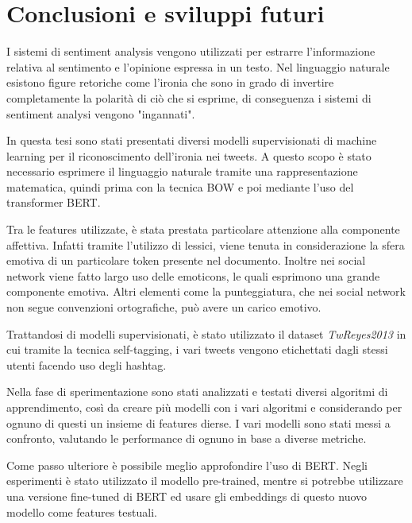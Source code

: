 \documentclass[oneside]{book}
\begin{document}
\chapter{Conclusioni e sviluppi futuri}
I sistemi di sentiment analysis vengono utilizzati per estrarre l'informazione relativa al sentimento e l'opinione espressa in un testo. Nel linguaggio naturale esistono figure retoriche come l'ironia che sono in grado di invertire completamente la polarità di ciò che si esprime, di conseguenza i sistemi di sentiment analysi vengono "ingannati".

In questa tesi sono stati presentati diversi modelli supervisionati di machine learning per il riconoscimento dell'ironia nei tweets. A questo scopo è stato necessario esprimere il linguaggio naturale tramite una rappresentazione matematica, quindi prima con la tecnica BOW e poi mediante l'uso del transformer BERT.

Tra le features utilizzate, è stata prestata particolare attenzione alla componente affettiva. Infatti tramite l'utilizzo di lessici, viene tenuta in considerazione la sfera emotiva di un particolare token presente nel documento. Inoltre nei social network viene fatto largo uso delle emoticons, le quali esprimono una grande componente emotiva. Altri elementi come la punteggiatura, che nei social network non segue convenzioni ortografiche, può avere un carico emotivo.

Trattandosi di modelli supervisionati, è stato utilizzato il dataset \textit{TwReyes2013} in cui tramite la tecnica self-tagging, i vari tweets vengono etichettati dagli stessi utenti facendo uso degli hashtag.

Nella fase di sperimentazione sono stati analizzati e testati diversi algoritmi di apprendimento, così da creare più modelli con i vari algoritmi e considerando per ognuno di questi un insieme di features dierse. I vari modelli sono stati messi a confronto, valutando le performance di ognuno in base a diverse metriche.

Come passo ulteriore è possibile meglio approfondire l'uso di BERT. Negli esperimenti è stato utilizzato il modello pre-trained, mentre si potrebbe utilizzare una versione fine-tuned di BERT ed usare gli embeddings di questo nuovo modello come features testuali.
\end{document}
